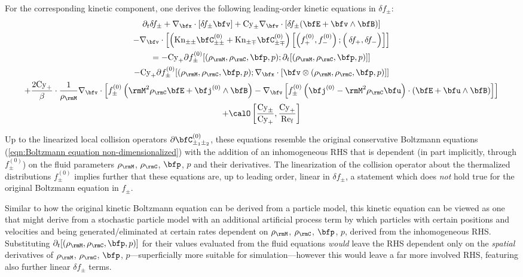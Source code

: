     For the corresponding kinetic component, one derives the following leading-order kinetic equations in $\delta\!f_{\pm}$:
    \begin{multline}\label{eqn:linearized Boltzmann equation}
        \partial_{t}\delta\!f_{\pm} + \nabla_{\bfx}\cdot[\delta\!f_{\pm}\bfv] + \rmCy_{\pm}\nabla_{\bfv}\cdot[\delta\!f_{\pm}(\bfE + \bfv\wedge\bfB)]  \\
        - \nabla_{\bfv}\cdot\left[\left(\rmKn_{\pm\pm}\bfC_{\pm\pm}^{(0)} + \rmKn_{\pm\mp}\bfC_{\pm\mp}^{(0)}\right)\left[\left(f_{+}^{(0)}, f_{-}^{(0)}\right); \left({\color{white} f_{+}^{(0)}}\!\!\!\!\!\!\!\!\!\delta\!f_{+}, \delta\!f_{-}\right)\right]\right]  \\
        =  - \rmCy_{+}\partial f_{\pm}^{(0)}[(\rho_{\rmM}, \rho_{\rmC}, \bfp, p); \partial_{t}[(\rho_{\rmM}, \rho_{\rmC}, \bfp, p)]]  \\
        - \rmCy_{+}\partial f_{\pm}^{(0)}[(\rho_{\rmM}, \rho_{\rmC}, \bfp, p); \nabla_{\bfx}\cdot[\bfv\otimes(\rho_{\rmM}, \rho_{\rmC}, \bfp, p)]]  \\
        + \frac{2\rmCy_{+}}{\beta}\cdot\frac{1}{\rho_{\rmM}}\nabla_{\bfv}\cdot\left[f_{\pm}^{(0)}\left(\rmM^{2}\rho_{\rmC}\bfE + \bfj^{(0)}\wedge\bfB\right) - \nabla_{\bfv}\left[f_{\pm}^{(0)}\left(\bfj^{(0)} - \rmM^{2}\rho_{\rmC}\bfu\right)\cdot\left(\bfE + \bfu\wedge\bfB\right)\right]\right]  \\
        + \calO\left[\frac{\rmCy_{\pm}}{\rmCy_{+}}, \frac{\rmCy_{+}}{\rmRef}\right]
    \end{multline}
    
    Up to the linearized local collision operators $\partial\bfC_{\pm_{1}\pm_{2}}^{(0)}$, these equations resemble the original conservative Boltzmann equations (\ref{eqn:Boltzmann equation non-dimensionalized}) with the addition of an inhomogeneous RHS that is dependent (in part implicitly, through $f_{\pm}^{(0)}$) on the fluid parameters $\rho_{\rmM}$, $\rho_{\rmC}$, $\bfp$, $p$ and their derivatives. The linearization of the collision operator about the thermalized distributions $f_{\pm}^{(0)}$ implies further that these equations are, up to leading order, linear in $\delta\!f_{\pm}$, a statement which does \emph{not} hold true for the original Boltzmann equation in $f_{\pm}$.

    Similar to how the original kinetic Boltzmann equation can be derived from a particle model, this kinetic equation can be viewed as one that might derive from a stochastic particle model with an additional artificial process term by which particles with certain positions and velocities and being generated/eliminated at certain rates dependent on $\rho_{\rmM}$, $\rho_{\rmC}$, $\bfp$, $p$, derived from the inhomogeneous RHS. Substituting $\partial_{t}[(\rho_{\rmM}, \rho_{\rmC}, \bfp, p)]$ for their values evaluated from the fluid equations \emph{would} leave the RHS dependent only on the \emph{spatial} derivatives of $\rho_{\rmM}$, $\rho_{\rmC}$, $\bfp$, $p$---superficially more suitable for simulation---however this would leave a far more involved RHS, featuring also further linear $\delta\!f_{\pm}$ terms.

